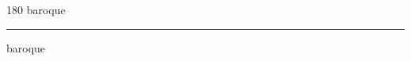 
\begin{frame}
\begin{center}
\begin{turn}{180}
{\fontsize{2.5cm}{1em}\selectfont baroque}
\end{turn}
\vspace{1em}\par  
\hrule
\vspace{1em}\par  
{\fontsize{2.5cm}{1em}\selectfont baroque}
\end{center}
\end{frame}
